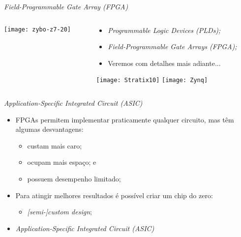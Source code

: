 \begin{frame}{\textit{Field-Programmable Gate Array (FPGA)}} 
    \begin{columns}
        \begin{column}{0.340\textwidth}
            \vspace{1cm}
            \texttt{[image: zybo-z7-20]}
        \end{column}            \begin{column}{0.60\textwidth}
            \begin{itemize}
                \item \textit{Programmable Logic Devices (PLDs);}
                \item \textit{Field-Programmable Gate Arrays (FPGA);}
                \item Veremos com detalhes mais adiante...
            \end{itemize}
            \vspace{1cm}
            \texttt{[image: Stratix10]} 
            \texttt{[image: Zynq]}
        \end{column}
    \end{columns}
\end{frame}

\begin{frame}{\textit{Application-Specific Integrated Circuit (ASIC)}}
    \begin{itemize}
        \item FPGAs permitem implementar praticamente qualquer circuito, mas têm algumas desvantagens:
        \begin{itemize}
            \item custam mais caro;
            \item ocupam mais espaço; e 
            \item possuem desempenho limitado;
        \end{itemize}  
        \item Para atingir melhores resultados é possível criar um chip do zero:
        \begin{itemize}
            \item \textit{[semi-]custom design};
        \end{itemize}
        \item \textit{Application-Specific Integrated Circuit (ASIC)}
    \end{itemize}
\end{frame}

